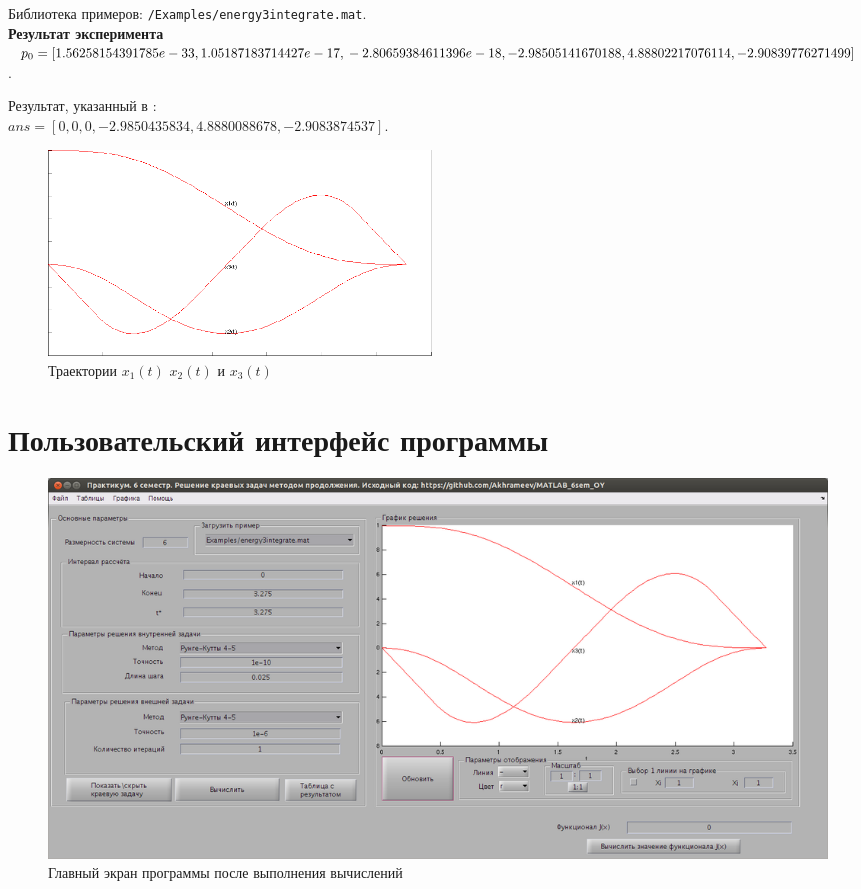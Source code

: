 Библиотека примеров: \texttt{/Examples/energy3integrate.mat}.
\newline\\
{\bf Результат эксперимента}
\newline\\
$p_0=[1.56258154391785e-33,    1.05187183714427e-17,\\	-2.80659384611396e-18,	-2.98505141670188,	4.88802217076114,	-2.90839776271499]$.

Результат, указанный в \cite{oy}:\\
$ans=[0, 0, 0, -2.9850435834, 4.8880088678, -2.9083874537]$.

\begin{figure}[t] 
\begin{center}
\includegraphics[width=4in]{Example3.png}
\end{center}
\caption{Траектории $x_1(t)$ $x_2(t)$ и $x_3(t)$}
\label{Example3_pic}
\end{figure}
\newpage
\section{Пользовательский интерфейс программы}

\begin{figure}[h!] 
\begin{center}
\includegraphics[scale=0.25]{mainWindow.jpeg}
\end{center}
\caption{Главный экран программы после выполнения вычислений}
\label{mainWindow_pic}
\end{figure}

